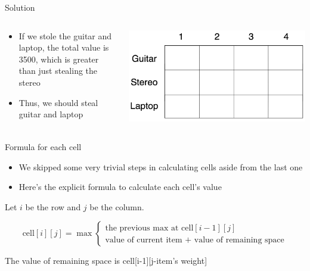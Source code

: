\documentclass[
  ignorenonframetext,
]{beamer}
\begin{document}
\begin{frame}{Solution}
\protect\hypertarget{solution}{}
\begin{columns}[T]
\begin{column}{0.5\textwidth}
\begin{itemize}
\item
  If we stole the guitar and laptop, the total value is 3500, which is
  greater than just stealing the stereo
\item
  Thus, we should steal guitar and laptop
\end{itemize}
\end{column}

\begin{column}{0.5\textwidth}
\includegraphics{images/dynamic.png}
\end{column}
\end{columns}
\end{frame}

\begin{frame}{Formula for each cell}
\protect\hypertarget{formula-for-each-cell}{}
\begin{itemize}
\item
  We skipped some very trivial steps in calculating cells aside from the
  last one
\item
  Here's the explicit formula to calculate each cell's value
\end{itemize}

Let \(i\) be the row and \(j\) be the column.

\[
\text{cell}[i][j] = \max
    \begin{cases}
        \text{the previous max at cell}[i-1][j]\\
        \text{value of current item + value of remaining space}
    \end{cases}
\]

The value of remaining space is cell{[}i-1{]}{[}j-item's weight{]}
\end{frame}
\end{document}

